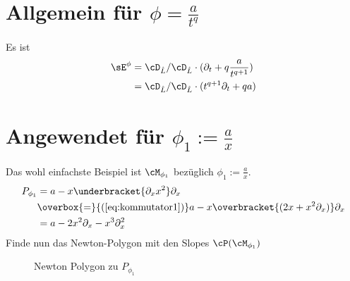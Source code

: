\section{Allgemein für $\phi=\frac{a}{t^q}$}
Es ist 
\begin{align*}
\sE^\phi &= \cD_{\hat L}/\cD_{\hat L}\cdot(\partial_t+q\frac{a}{t^{q+1}})\\
  &= \cD_{\hat L}/\cD_{\hat L}\cdot(t^{q+1}\partial_t+qa)\\
\end{align*}

\section{Angewendet für $\phi_1:=\frac{a}{x}$}
Das wohl einfachste Beispiel ist $\cM_{\phi_1}$ bezüglich
$\phi_1:=\frac{a}{x}$.
\begin{align*}
P_{\phi_1} &=a-x\underbracket{\partial_xx^2}\partial_x\\
           &\overbox{=}{(\ref{eq:kommutator1})}
             a-x\overbracket{(2x + x^2\partial_x)}\partial_x\\
           &=a-2x^2\partial_x - x^3\partial_x^2\\
\end{align*}
Finde nun das Newton-Polygon mit den Slopes $\cP(\cM_{\phi_1})$
\begin{figure}[H]
\caption{Newton Polygon zu $P_{\phi_1}$}
\begin{center}
\end{center}
\end{figure}

